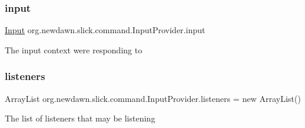\subsubsection{\texorpdfstring{input}{input}}
{\footnotesize\ttfamily \mbox{\hyperlink{classorg_1_1newdawn_1_1slick_1_1_input}{Input}} org.\+newdawn.\+slick.\+command.\+Input\+Provider.\+input\hspace{0.3cm}{\ttfamily [private]}}

The input context we\textquotesingle{}re responding to \mbox{\label{classorg_1_1newdawn_1_1slick_1_1command_1_1_input_provider_a007146935ecc6c0f69ff3d7958042867}} 
\subsubsection{\texorpdfstring{listeners}{listeners}}
{\footnotesize\ttfamily Array\+List org.\+newdawn.\+slick.\+command.\+Input\+Provider.\+listeners = new Array\+List()\hspace{0.3cm}{\ttfamily [private]}}

The list of listeners that may be listening 